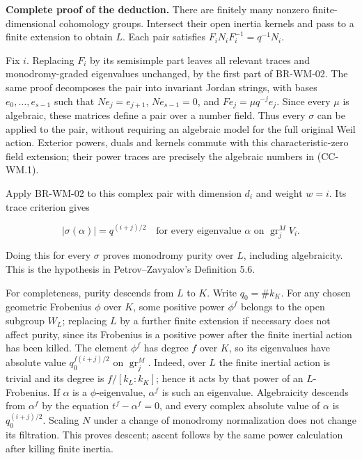 \documentclass[11pt,a4paper]{article}
\theoremstyle{definition}\newtheorem{definition}[theorem]{Definition}
\theoremstyle{remark}\newtheorem{remark}[theorem]{Remark}
\begin{document}
\textbf{Complete proof of the deduction.} There are finitely many
nonzero finite-dimensional cohomology groups. Intersect their open
inertia kernels and pass to a finite extension to obtain \(L\). Each
pair satisfies \(F_iN_iF_i^{-1}=q^{-1}N_i\).

Fix \(i\). Replacing \(F_i\) by its semisimple part leaves all relevant
traces and monodromy-graded eigenvalues unchanged, by the first part of
BR-WM-02. The same proof decomposes the pair into invariant Jordan
strings, with bases \(e_0,\ldots,e_{s-1}\) such that \(Ne_j=e_{j+1}\),
\(Ne_{s-1}=0\), and \(Fe_j=\mu q^{-j}e_j\). Since every \(\mu\) is
algebraic, these matrices define a pair over a number field. Thus every
\(\sigma\) can be applied to the pair, without requiring an algebraic
model for the full original Weil action. Exterior powers, duals and
kernels commute with this characteristic-zero field extension; their
power traces are precisely the algebraic numbers in (CC-WM.1).

Apply BR-WM-02 to this complex pair with dimension \(d_i\) and weight
\(w=i\). Its trace criterion gives

\[
 |\sigma(\alpha)|=q^{(i+j)/2}
 \quad\text{for every eigenvalue }\alpha
 \text{ on }\operatorname{gr}^M_jV_i.
\]

Doing this for every \(\sigma\) proves monodromy purity over \(L\),
including algebraicity. This is the hypothesis in Petrov--Zavyalov's
Definition 5.6.

For completeness, purity descends from \(L\) to \(K\). Write
\(q_0=\#k_K\). For any chosen geometric Frobenius \(\phi\) over \(K\),
some positive power \(\phi^f\) belongs to the open subgroup \(W_L\);
replacing \(L\) by a further finite extension if necessary does not
affect purity, since its Frobenius is a positive power after the finite
inertial action has been killed. The element \(\phi^f\) has degree \(f\)
over \(K\), so its eigenvalues have absolute value \(q_0^{f(i+j)/2}\) on
\(\operatorname{gr}^M_j\). Indeed, over \(L\) the finite inertial action
is trivial and its degree is \(f/[k_L:k_K]\); hence it acts by that
power of an \(L\)-Frobenius. If \(\alpha\) is a \(\phi\)-eigenvalue,
\(\alpha^f\) is such an eigenvalue. Algebraicity descends from
\(\alpha^f\) by the equation \(t^f-\alpha^f=0\), and every complex
absolute value of \(\alpha\) is \(q_0^{(i+j)/2}\). Scaling \(N\) under a
change of monodromy normalization does not change its filtration. This
proves descent; ascent follows by the same power calculation after
killing finite inertia.
\end{document}
